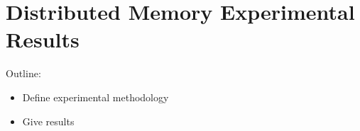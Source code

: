 \section{Distributed Memory Experimental Results} 
\label{sec:scaling_out}

Outline:
\begin{itemize}
\item Define experimental methodology
\item Give results
\end{itemize}
